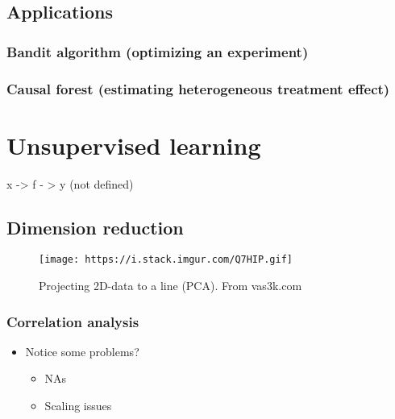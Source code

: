 \documentclass[
]{book}
\begin{document}
\hypertarget{applications-1}{%
\subsection{Applications}\label{applications-1}}

\hypertarget{bandit-algorithm-optimizing-an-experiment}{%
\subsubsection{Bandit algorithm (optimizing an experiment)}\label{bandit-algorithm-optimizing-an-experiment}}

\hypertarget{causal-forest-estimating-heterogeneous-treatment-effect}{%
\subsubsection{Causal forest (estimating heterogeneous treatment effect)}\label{causal-forest-estimating-heterogeneous-treatment-effect}}

\hypertarget{unsupervised-learning}{%
\section{Unsupervised learning}\label{unsupervised-learning}}

x -\textgreater{} f - \textgreater{} y (not defined)

\hypertarget{dimension-reduction}{%
\subsection{Dimension reduction}\label{dimension-reduction}}

\begin{figure}
\centering
\texttt{[image: https://i.stack.imgur.com/Q7HIP.gif]}
\caption{Projecting 2D-data to a line (PCA). From vas3k.com}
\end{figure}

\hypertarget{correlation-analysis}{%
\subsubsection{Correlation analysis}\label{correlation-analysis}}

\begin{itemize}
\item
  Notice some problems?

  \begin{itemize}
  \item
    NAs
  \item
    Scaling issues
  \end{itemize}
\end{itemize}
\end{document}
